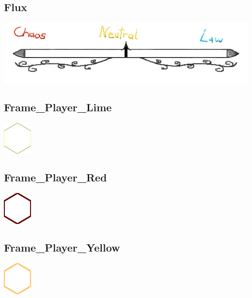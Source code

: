 \documentclass[a4paper,12pt]{scrartcl}
\begin{document}
	\subsection{Flux}
	\begin{center}\includegraphics{Prog2_EA_V2/Art/Flux.png}\end{center}
	\subsection{Frame\_Player\_Lime}
	\begin{center}\includegraphics{Prog2_EA_V2/Art/Frame_Player_Lime.png}\end{center}
	\subsection{Frame\_Player\_Red}
	\begin{center}\includegraphics{Prog2_EA_V2/Art/Frame_Player_Red.png}\end{center}
	\subsection{Frame\_Player\_Yellow}
	\begin{center}\includegraphics{Prog2_EA_V2/Art/Frame_Player_Yellow.png}\end{center}
\end{document}
